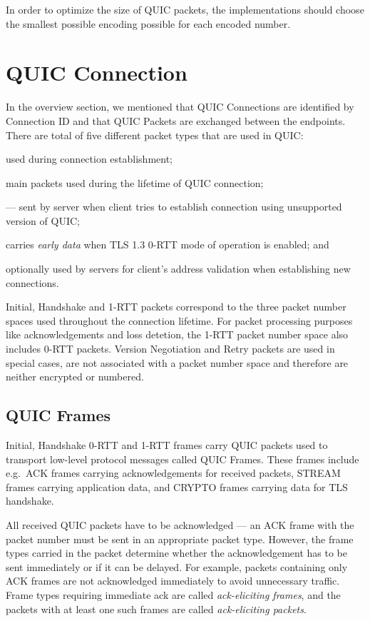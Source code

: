 In order to optimize the size of QUIC packets, the implementations should choose the smallest
possible encoding possible for each encoded number.

\section{QUIC Connection}

In the overview section, we mentioned that QUIC Connections are identified by Connection ID and that
QUIC Packets are exchanged between the endpoints. There are total of five different packet types
that are used in QUIC\@:

\begin{enumerate}
     used during connection establishment;

     main packets used during the lifetime of QUIC connection;

     --- sent by server when client tries to establish connection using
    unsupported version of QUIC\@;

     carries \textit{early data} when TLS 1.3 0-RTT mode of operation is enabled; and

     optionally used by servers for client's address validation when establishing new connections.
\end{enumerate}

Initial, Handshake and 1-RTT packets correspond to the three packet number spaces used throughout
the connection lifetime. For packet processing purposes like acknowledgements and loss detetion, the
1-RTT packet number space also includes 0-RTT packets. Version Negotiation and Retry packets are
used in special cases, are not associated with a packet number space and therefore are neither
encrypted or numbered.

\subsection{QUIC Frames}

Initial, Handshake 0-RTT and 1-RTT frames carry QUIC packets used to transport low-level protocol
messages called QUIC Frames. These frames include e.g.\ ACK frames carrying acknowledgements for
received packets, STREAM frames carrying application data, and CRYPTO frames carrying data for TLS
handshake.

All received QUIC packets have to be acknowledged --- an ACK frame with the packet number must be
sent in an appropriate packet type. However, the frame types carried in the packet determine whether
the acknowledgement has to be sent immediately or if it can be delayed. For example, packets
containing only ACK frames are not acknowledged immediately to avoid unnecessary traffic. Frame
types requiring immediate ack are called \textit{ack-eliciting frames}, and the packets with at
least one such frames are called \textit{ack-eliciting packets}.

